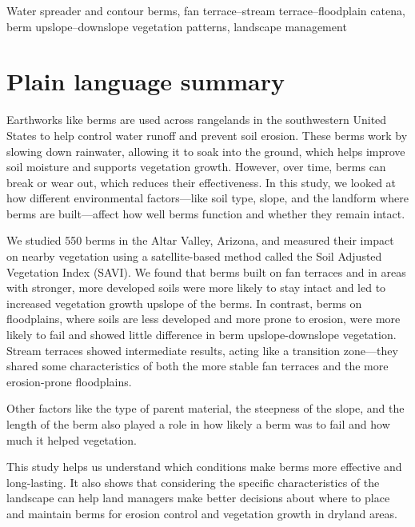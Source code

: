 \documentclass[review]{elsarticle}
\begin{document}
\begin{frontmatter}
\begin{keyword}
Water spreader and contour berms, fan terrace--stream terrace--floodplain catena, berm upslope--downslope vegetation patterns, landscape management  
\end{keyword}

\end{frontmatter}

\linenumbers

\section*{Plain language summary}
Earthworks like berms are used across rangelands in the southwestern United States to help control water runoff and prevent soil erosion. These berms work by slowing down rainwater, allowing it to soak into the ground, which helps improve soil moisture and supports vegetation growth. However, over time, berms can break or wear out, which reduces their effectiveness. In this study, we looked at how different environmental factors—like soil type, slope, and the landform where berms are built—affect how well berms function and whether they remain intact.

We studied 550 berms in the Altar Valley, Arizona, and measured their impact on nearby vegetation using a satellite-based method called the Soil Adjusted Vegetation Index (SAVI). We found that berms built on fan terraces and in areas with stronger, more developed soils were more likely to stay intact and led to increased vegetation growth upslope of the berms. In contrast, berms on floodplains, where soils are less developed and more prone to erosion, were more likely to fail and showed little difference in berm upslope-downslope vegetation. Stream terraces showed intermediate results, acting like a transition zone—they shared some characteristics of both the more stable fan terraces and the more erosion-prone floodplains.

Other factors like the type of parent material, the steepness of the slope, and the length of the berm also played a role in how likely a berm was to fail and how much it helped vegetation. 

This study helps us understand which conditions make berms more effective and long-lasting. It also shows that considering the specific characteristics of the landscape can help land managers make better decisions about where to place and maintain berms for erosion control and vegetation growth in dryland areas.
\end{document}
